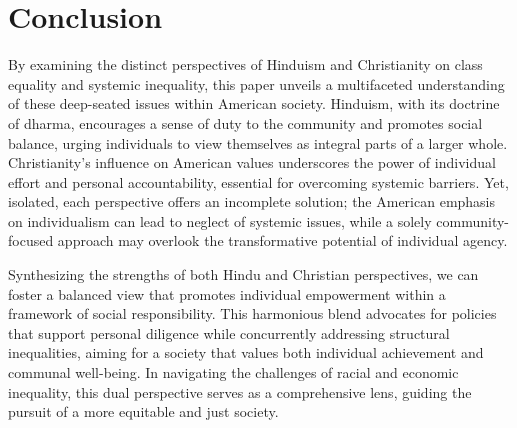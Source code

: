 \documentclass[
	letterpaper, %
	10pt, %
	unnumberedsections, %
	twoside, %
]{LTJournalArticle}
\begin{document}
\section{Conclusion}
By examining the distinct perspectives of Hinduism and Christianity on class equality and systemic inequality, this paper unveils a multifaceted understanding of these deep-seated issues within American society. Hinduism, with its doctrine of dharma, encourages a sense of duty to the community and promotes social balance, urging individuals to view themselves as integral parts of a larger whole. Christianity’s influence on American values underscores the power of individual effort and personal accountability, essential for overcoming systemic barriers. Yet, isolated, each perspective offers an incomplete solution; the American emphasis on individualism can lead to neglect of systemic issues, while a solely community-focused approach may overlook the transformative potential of individual agency.

Synthesizing the strengths of both Hindu and Christian perspectives, we can foster a balanced view that promotes individual empowerment within a framework of social responsibility. This harmonious blend advocates for policies that support personal diligence while concurrently addressing structural inequalities, aiming for a society that values both individual achievement and communal well-being. In navigating the challenges of racial and economic inequality, this dual perspective serves as a comprehensive lens, guiding the pursuit of a more equitable and just society.
\end{document}

